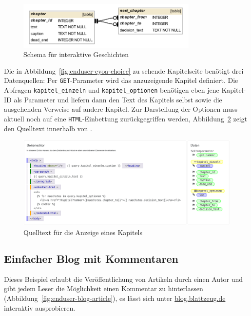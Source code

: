 \begin{figure}[h]
  \centering \includegraphics[width=0.8\textwidth]{images/db-schema/cyoa}
  \caption{Schema für interaktive Geschichten}
  \label{fig:project-cyoa-schema}
\end{figure}

Die in Abbildung~\ref{fig:enduser-cyoa-choice} zu sehende Kapitelseite benötigt drei Datenquellen: Per \texttt{GET}-Parameter wird das anzuzeigende Kapitel definiert. Die Abfragen \texttt{kapitel\_einzeln} und \texttt{kapitel\_optionen} benötigen eben jene Kapitel-ID als Parameter und liefern dann den Text des Kapitels selbst sowie die ausgehenden Verweise auf andere Kapitel. Zur Darstellung der Optionen muss aktuell noch auf eine \texttt{HTML}-Einbettung zurückgegriffen werden, Abbildung~\ref{fig:project-cyoa-page-chapter} zeigt den Quelltext innerhalb von \idename{}.

\begin{figure}[h]
  \centering \includegraphics[width=\textwidth]{images/screenshots/20161019/editor-project-cyoa-page-chapter.png}
  \caption{Quelltext für die Anzeige eines Kapitels}
  \label{fig:project-cyoa-page-chapter}
\end{figure}

\subsection{Einfacher Blog mit Kommentaren}

Dieses Beispiel erlaubt die Veröffentlichung von Artikeln durch einen Autor und gibt jedem Leser die Möglichkeit einen Kommentar zu hinterlassen (Abbildung~\ref{fig:enduser-blog-article}), es lässt sich unter \href{http://blog.blattzeug.de/}{blog.blattzeug.de} interaktiv ausprobieren.

